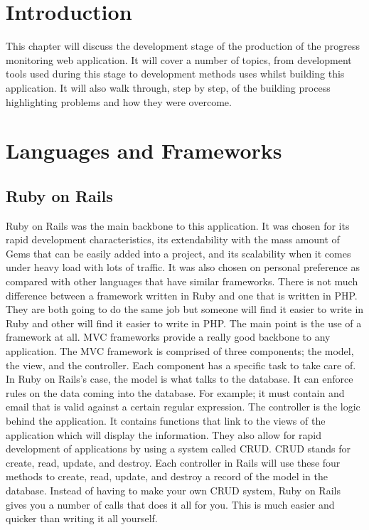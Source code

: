 \section{Introduction}
This chapter will discuss the development stage of the production of the progress monitoring web application. It will cover a number of topics, from development tools used during this stage to development methods uses whilst building this application. It will also walk through, step by step, of the building process highlighting problems and how they were overcome.\\

\section{Languages and Frameworks}
\subsection{Ruby on Rails}
Ruby on Rails was the main backbone to this application. It was chosen for its rapid development characteristics, its extendability with the mass amount of Gems that can be easily added into a project, and its scalability when it comes under heavy load with lots of traffic. It was also chosen on personal preference as compared with other languages that have similar frameworks. There is not much difference between a framework written in Ruby and one that is written in PHP. They are both going to do the same job but someone will find it easier to write in Ruby and other will find it easier to write in PHP. The main point is the use of a framework at all. MVC frameworks provide a really good backbone to any application. The MVC framework is comprised of three components; the model, the view, and the controller. Each component has a specific task to take care of. In Ruby on Rails's case, the model is what talks to the database. It can enforce rules on the data coming into the database. For example; it must contain and email that is valid against a certain regular expression. The controller is the logic behind the application. It contains functions that link to the views of the application which will display the information. They also allow for rapid development of applications by using a system called CRUD. CRUD stands for create, read, update, and destroy. Each controller in Rails will use these four methods to create, read, update, and destroy a record of the model in the database. Instead of having to make your own CRUD system, Ruby on Rails gives you a number of calls that does it all for you. This is much easier and quicker than writing it all yourself.\\

